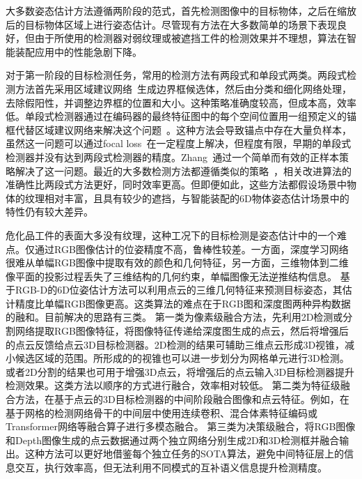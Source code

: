 \documentclass[12pt]{article}
\begin{document}
大多数姿态估计方法遵循两阶段的范式，首先检测图像中的目标物体，之后在缩放后的目标物体区域上进行姿态估计。尽管现有方法在大多数简单的场景下表现良好，但由于所使用的检测器对弱纹理或被遮挡工件的检测效果并不理想，算法在智能装配应用中的性能急剧下降。

对于第一阶段的目标检测任务，常用的检测方法有两段式和单段式两类\cite{ATSS, fcosv1, fcosv2, PAA, faster-rcnn, maskrcnn}。两段式检测方法首先采用区域建议网络~\cite{faster-rcnn, maskrcnn}生成边界框候选体，然后由分类和细化网络处理，去除假阳性，并调整边界框的位置和大小。这种策略准确度较高，但成本高，效率低。单段式检测器通过在编码器的最终特征图中的每个空间位置用一组预定义的锚框代替区域建议网络来解决这个问题~\cite{fcosv1,retinanet,yolov1}。这种方法会导致锚点中存在大量负样本，虽然这一问题可以通过focal loss~\cite{retinanet,fpn}在一定程度上解决，但程度有限，早期的单段式检测器并没有达到两段式检测器的精度。Zhang~\cite{ATSS}通过一个简单而有效的正样本策略解决了这一问题。最近的大多数检测方法都遵循类似的策略~\cite{fcosv2, PAA, autoassign, OTA, TTF, yolov3}，相关改进算法的准确性比两段式方法更好，同时效率更高。但即便如此，这些方法都假设场景中物体的纹理相对丰富，且具有较少的遮挡，与智能装配的6D物体姿态估计场景中的特性仍有较大差异。

危化品工件的表面大多没有纹理，这种工况下的目标检测是姿态估计中的一个难点。仅通过RGB图像估计的位姿精度不高，鲁棒性较差。一方面，深度学习网络很难从单幅RGB图像中提取有效的颜色和几何特征，另一方面，三维物体到二维像平面的投影过程丢失了三维结构的几何约束，单幅图像无法逆推结构信息。
基于RGB-D的6D位姿估计方法可以利用点云的三维几何特征来预测目标姿态，其估计精度比单幅RGB图像更高。这类算法的难点在于RGB图和深度图两种异构数据的融和。目前解决的思路有三类。
第一类为像素级融合方法，先利用2D检测或分割网络提取RGB图像特征，将图像特征传递给深度图生成的点云，然后将增强后的点云反馈给点云3D目标检测器。2D检测的结果可辅助三维点云形成3D视锥\cite{Qi2018}，减小候选区域的范围。所形成的的视锥也可以进一步划分为网格单元\cite{Wang2019}进行3D检测。或者2D分割的结果也可用于增强3D点云\cite{Vora2020}，将增强后的点云输入3D目标检测器提升检测效果。这类方法以顺序的方式进行融合，效率相对较低。
第二类为特征级融合方法，在基于点云的3D目标检测器的中间阶段融合图像和点云特征。例如，在基于网格的检测网络骨干的中间层中使用连续卷积\cite{Liang2018, Liang2019}、混合体素特征编码\cite{Sindagi2019}或Transformer\cite{Zhang2022}网络等融合算子进行多模态融合。
第三类为决策级融合，将RGB图像和Depth图像生成的点云数据通过两个独立网络分别生成2D和3D检测框\cite{Asvadi2018}并融合输出。这种方法可以更好地借鉴每个独立任务的SOTA算法，避免中间特征层上的信息交互，执行效率高，但无法利用不同模式的互补语义信息\cite{Pang2020}提升检测精度。
\end{document}
